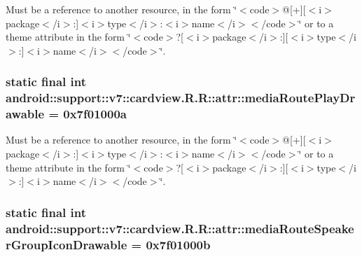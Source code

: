 Must be a reference to another resource, in the form \char`\"{}$<$code$>$@\mbox{[}+\mbox{]}\mbox{[}$<$i$>$package$<$/i$>$:\mbox{]}$<$i$>$type$<$/i$>$:$<$i$>$name$<$/i$>$$<$/code$>$\char`\"{} or to a theme attribute in the form \char`\"{}$<$code$>$?\mbox{[}$<$i$>$package$<$/i$>$:\mbox{]}\mbox{[}$<$i$>$type$<$/i$>$:\mbox{]}$<$i$>$name$<$/i$>$$<$/code$>$\char`\"{}. \hypertarget{classandroid_1_1support_1_1v7_1_1cardview_1_1_r_1_1attr_9c0051e9ef661c1591bfbbfe285aae2b}{
\subsubsection[{mediaRoutePlayDrawable}]{\setlength{\rightskip}{0pt plus 5cm}static final int android::support::v7::cardview.R.R::attr::mediaRoutePlayDrawable = 0x7f01000a}}
\label{classandroid_1_1support_1_1v7_1_1cardview_1_1_r_1_1attr_9c0051e9ef661c1591bfbbfe285aae2b}


Must be a reference to another resource, in the form \char`\"{}$<$code$>$@\mbox{[}+\mbox{]}\mbox{[}$<$i$>$package$<$/i$>$:\mbox{]}$<$i$>$type$<$/i$>$:$<$i$>$name$<$/i$>$$<$/code$>$\char`\"{} or to a theme attribute in the form \char`\"{}$<$code$>$?\mbox{[}$<$i$>$package$<$/i$>$:\mbox{]}\mbox{[}$<$i$>$type$<$/i$>$:\mbox{]}$<$i$>$name$<$/i$>$$<$/code$>$\char`\"{}. \hypertarget{classandroid_1_1support_1_1v7_1_1cardview_1_1_r_1_1attr_0760f32e3e3077fc81f2efffaf419ea5}{
\subsubsection[{mediaRouteSpeakerGroupIconDrawable}]{\setlength{\rightskip}{0pt plus 5cm}static final int android::support::v7::cardview.R.R::attr::mediaRouteSpeakerGroupIconDrawable = 0x7f01000b}}
\label{classandroid_1_1support_1_1v7_1_1cardview_1_1_r_1_1attr_0760f32e3e3077fc81f2efffaf419ea5}


